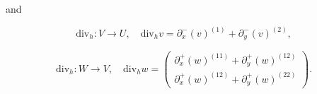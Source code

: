 \documentclass{article}
\begin{document}
and


\begin{equation}
\mathrm{div}_h : V \rightarrow U, \quad \mathrm{div}_h v = \partial_x^- (v)^{(1)} + \partial_y^- (v)^{(2)},
\end{equation}

\begin{equation}
\mathrm{div}_h : W \rightarrow V, \quad \mathrm{div}_h w = 
\begin{pmatrix}
\partial_x^+ (w)^{(11)} + \partial_y^+ (w)^{(12)} \\
\partial_x^+ (w)^{(12)} + \partial_y^+ (w)^{(22)}
\end{pmatrix}.
\end{equation}
\end{document}
